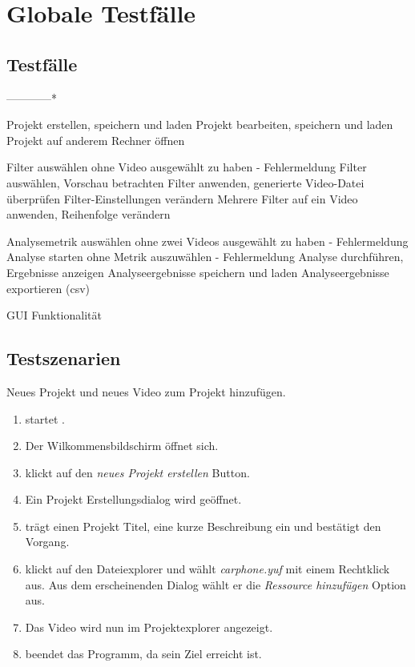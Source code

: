 \chapter{Globale Testfälle}
\section{Testfälle}
\setcounter{counterKriterien}{0}

------------*

 Projekt erstellen, speichern und laden
 Projekt bearbeiten, speichern und laden
 Projekt auf anderem Rechner öffnen

 Filter auswählen ohne Video ausgewählt zu haben - Fehlermeldung
 Filter auswählen, Vorschau betrachten
 Filter anwenden, generierte Video-Datei überprüfen
 Filter-Einstellungen verändern
 Mehrere Filter auf ein Video anwenden, Reihenfolge verändern

 Analysemetrik auswählen ohne zwei Videos ausgewählt zu haben - Fehlermeldung
 Analyse starten ohne Metrik auszuwählen - Fehlermeldung
 Analyse durchführen, Ergebnisse anzeigen
 Analyseergebnisse speichern und laden
 Analyseergebnisse exportieren (csv)

 GUI Funktionalität




\section{Testszenarien}
\setcounter{counterKriterien}{0}


 Neues Projekt und neues Video zum Projekt hinzufügen.\\
\begin{enumerate}
\item \dAU startet \projektTitel.
\item Der Wilkommensbildschirm öffnet sich.
\item \dAU klickt auf den \emph{neues Projekt erstellen} Button.
\item Ein Projekt Erstellungsdialog wird geöffnet.
\item \dAU trägt einen Projekt Titel, eine kurze Beschreibung ein und bestätigt den Vorgang.
\item \dAU klickt auf den Dateiexplorer und wählt \emph{carphone.yuf} mit einem Rechtklick aus. Aus dem erscheinenden Dialog wählt er die \emph{Ressource hinzufügen} Option aus.
\item Das Video wird nun im Projektexplorer angezeigt.
\item \dAU beendet das Programm, da sein Ziel erreicht ist.
\end{enumerate}


